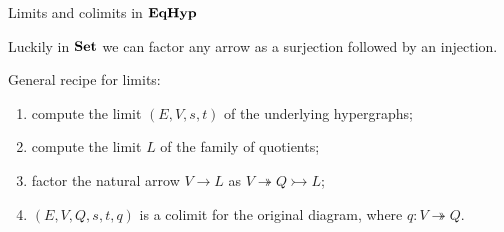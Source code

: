 \documentclass{beamer}
\newcommand{\catname}[1]{\textbf{\textup{#1}}}
\newcommand{\EqHyp}{\catname{EqHyp}} %
\newcommand{\eto}{\twoheadrightarrow}
\newcommand{\mto}{\rightarrowtail}
\begin{document}
\begin{frame}{Limits and colimits in $\EqHyp$}

Luckily in $\catname{Set}$ we can factor any arrow as a surjection followed by an injection. 

\pause 
General recipe for limits: \pause 

\begin{enumerate}
	\item compute the limit $(E, V, s,t)$ of the underlying hypergraphs; \pause 
	\item compute the limit $L$ of the family of quotients; \pause 
	\item factor the natural arrow $V\to L$ as $V\eto Q \mto L$; \pause 
	\item $(E, V, Q, s,t, q )$ is a colimit for the original diagram, where $q\colon V\eto Q$.
\end{enumerate}	
	
\end{frame}
\end{document}
